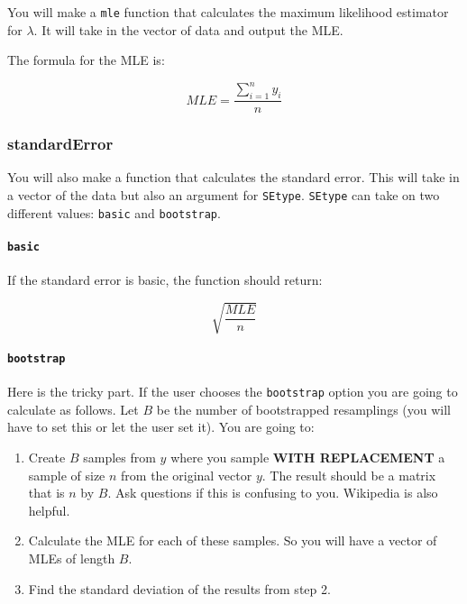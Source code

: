 \documentclass[
]{article}
\providecommand{\tightlist}{%
  \setlength{\itemsep}{0pt}\setlength{\parskip}{0pt}}
\begin{document}
You will make a \texttt{mle} function that calculates the maximum
likelihood estimator for \(\lambda\). It will take in the vector of data
and output the MLE.

The formula for the MLE is:

\[MLE = \frac{\sum_{i=1}^ny_i}{n}\]

\hypertarget{standarderror}{%
\subsubsection{standardError}\label{standarderror}}

You will also make a function that calculates the standard error. This
will take in a vector of the data but also an argument for
\texttt{SEtype}. \texttt{SEtype} can take on two different values:
\texttt{basic} and \texttt{bootstrap}.

\hypertarget{basic}{%
\paragraph{\texorpdfstring{\texttt{basic}}{basic}}\label{basic}}

If the standard error is basic, the function should return:

\[\sqrt{\frac{MLE}{n}}\]

\hypertarget{bootstrap}{%
\paragraph{\texorpdfstring{\texttt{bootstrap}}{bootstrap}}\label{bootstrap}}

Here is the tricky part. If the user chooses the \texttt{bootstrap}
option you are going to calculate as follows. Let \(B\) be the number of
bootstrapped resamplings (you will have to set this or let the user set
it). You are going to:

\begin{enumerate}
\def\labelenumi{\arabic{enumi}.}
\tightlist
\item
  Create \(B\) samples from \(y\) where you sample \textbf{WITH
  REPLACEMENT} a sample of size \(n\) from the original vector \(y\).
  The result should be a matrix that is \(n\) by \(B\). Ask questions if
  this is confusing to you. Wikipedia is also helpful.
\item
  Calculate the MLE for each of these samples. So you will have a vector
  of MLEs of length \(B\).
\item
  Find the standard deviation of the results from step 2.
\end{enumerate}
\end{document}
